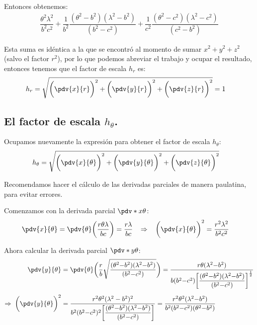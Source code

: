 Entonces obtenemos:
\begin{align*}
\dfrac{\theta^{2} \lambda^{2}}{b^{2} c^{2}} + \dfrac{1}{b^{2}} \dfrac{ (\theta^{2} - b^{2}) (\lambda^{2} - b^{2})}{(b^{2} - c^{2})} + \dfrac{1}{c^{2}} \dfrac{ (\theta^{2} - c^{2}) (\lambda^{2} - c^{2}) }{(c^{2} - b^{2})}
\end{align*}

Esta suma es idéntica a la que se encontró al momento de sumar \break \hfill $x^{2} + y^{2} + z^{2}$ (salvo el factor $r^{2}$), por lo que podemos abreviar el trabajo y ocupar el resultado, entonces tenemos que el factor de escala $h_{r}$ es:
\begin{align*}
h_{r} &= \sqrt{\bigg( \pdv{x}{r} \bigg)^{2} + \bigg( \pdv{y}{r} \bigg)^{2} + \bigg( \pdv{z}{r} \bigg)^{2}} = 1
\end{align*}

\subsection*{El factor de escala \texorpdfstring{$h_{\theta}$}{ht}.}

Ocupamos nuevamente la expresión para obtener el factor de escala $h_{\theta}$:
\begin{align*}
h_{\theta} &= \sqrt{\bigg( \pdv{x}{\theta} \bigg)^{2} + \bigg( \pdv{y}{\theta} \bigg)^{2} + \bigg( \pdv{z}{\theta} \bigg)^{2}}
\end{align*}

Recomendamos hacer el cálculo de las derivadas parciales de manera paulatina, para evitar errores.
\par
Comenzamos con la derivada parcial $\pdv*{x}{\theta}$:
\begin{align*}
\pdv{x}{\theta} =  \displaystyle \pdv{\theta} \bigg( \dfrac{r \theta \lambda}{b c} \bigg) =  \dfrac{r \lambda}{b c} \hspace{0.3cm} \Rightarrow \hspace{0.3cm} \bigg( \pdv{x}{\theta} \bigg)^{2} &= \dfrac{r^{2} \lambda^{2}}{b^{2} c^{2}}
\end{align*}

Ahora calcular la derivada parcial $\pdv*{y}{\theta}$:
\begin{align*}
\pdv{y}{\theta} &=  \pdv{\theta} \bigg( \dfrac{r}{b} \sqrt{\dfrac{ (\theta^{2} {-} b^{2}) (\lambda^{2} {-} b^{2}) }{(b^{2} {-} c^{2})}} \bigg) = \dfrac{r \theta (\lambda^{2} {-} b^{2})}{b (b^{2} {-} c^{2}) \bigg[ \dfrac{(\theta^{2} {-} b^{2})(\lambda^{2} {-} b^{2})}{(b^{2} {-} c^{2})} \bigg]^{\frac{1}{2}}} \\[0.5em]
\Rightarrow \hspace{0.1cm} \bigg( \pdv{y}{\theta} \bigg)^{2} &= \dfrac{r^{2} \theta^{2} (\lambda^{2} - b^{2})^{2}}{b^{2} (b^{2} {-} c^{2})^{2} \bigg[ \dfrac{(\theta^{2} {-} b^{2})(\lambda^{2} {-} b^{2})}{(b^{2} {-} c^{2})} \bigg]} = \dfrac{r^{2} \theta^{2} (\lambda^{2} {-} b^{2})}{b^{2} (b^{2} {-} c^{2}) (\theta^{2} {-} b^{2})}
\end{align*}  

